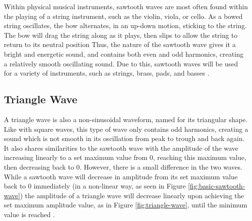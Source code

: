 


Within physical musical instruments, sawtooth waves are most often found within the playing of a string instrument, such as the violin, viola, or cello. As a bowed string oscillates, the bow alternates, in an up-down motion, sticking to the string. The bow will drag the string along as it plays, then slips to allow the string to return to its neutral position \cite{Kapur_Cook_Salazar_Wang_2015} Thus, the nature of the sawtooth wave gives it a bright and energetic sound, and contains both even and odd harmonics, creating a relatively smooth oscillating sound. Due to this, sawtooth waves will be used for a variety of instruments, such as strings, brass, pads, and basses \cite{Dowsett_2016}. 


\subsection{Triangle Wave}\label{subsection:triangle-wave}

A triangle wave is also a non-sinusoidal waveform, named for its triangular shape. Like with square waves, this type of wave only contains odd harmonics, creating a sound which is not smooth in its oscillation from peak to trough and back again. It also shares similarities to the sawtooth wave with the amplitude of the wave increasing linearly to a set maximum value from 0, reaching this maximum value, then decreasing back to 0. However, there is a small difference in the two waves. While a sawtooth wave will decrease in amplitude from its set maximum value back to 0 immediately (in a non-linear way, as seen in Figure \ref{fig:basic-sawtooth-wave}) the amplitude of a triangle wave will decrease linearly upon achieving the set maximum amplitude value, as in Figure \ref{fig:triangle-wave}, until the minimum value is reached \cite{Tarr_2019}.

